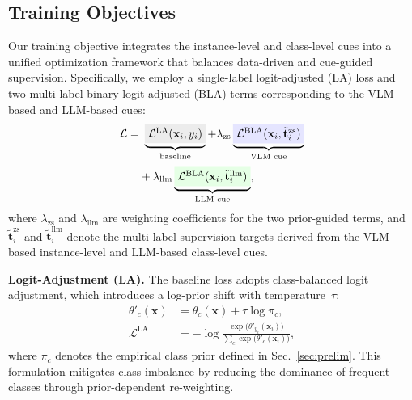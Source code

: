 \subsection{Training Objectives}
\label{sec:objective}
Our training objective integrates the instance-level and class-level cues into a unified optimization framework that balances data-driven and cue-guided supervision. 
Specifically, we employ a single-label logit-adjusted (LA) loss and two multi-label binary logit-adjusted (BLA) terms corresponding to the VLM-based and LLM-based cues:
\begin{equation}
\begin{aligned}
\mathcal{L}
= &
~\underbrace{
  \colorbox{gray!15}{$\mathcal{L}^{\text{LA}}(\mathbf{x}_i, y_i)$}
}_{\text{baseline}}
+ \lambda_{\text{zs}}
  \underbrace{
  \colorbox{blue!10}{$\mathcal{L}^{\text{BLA}}(\mathbf{x}_i, \tilde{\mathbf{t}}^{\text{zs}}_i)$}
}_{\text{VLM cue}}
\\[2pt]
&+ \lambda_{\text{llm}}
  \underbrace{
  \colorbox{green!10}{$\mathcal{L}^{\text{BLA}}(\mathbf{x}_i, \tilde{\mathbf{t}}^{\text{llm}}_i)$}
}_{\text{LLM cue}},
\end{aligned}
\label{eq:overall_loss}
\end{equation}
where $\lambda_{\text{zs}}$ and $\lambda_{\text{llm}}$ are weighting coefficients for the two prior-guided terms, and 
$\tilde{\mathbf{t}}^{\text{zs}}_i$ and $\tilde{\mathbf{t}}^{\text{llm}}_i$ denote the multi-label supervision targets derived from the VLM-based instance-level and LLM-based class-level cues.


\noindent \textbf{Logit-Adjustment (LA).} The baseline loss adopts class-balanced logit adjustment, which introduces a log-prior shift with temperature~$\tau$:
\begin{equation}
\begin{split}
\theta'_c(\mathbf{x}) &= \theta_c(\mathbf{x}) + \tau \log \pi_c, \\
\mathcal{L}^{\text{LA}} 
&= -\log
\frac{\exp\!\big(\theta'_{y_i}(\mathbf{x}_i)\big)}
{\sum_{c}\exp\!\big(\theta'_{c}(\mathbf{x}_i)\big)},
\end{split}
\end{equation}
where $\pi_c$ denotes the empirical class prior defined in Sec.~\ref{sec:prelim}.
This formulation mitigates class imbalance by reducing the dominance of frequent classes through prior-dependent re-weighting.



